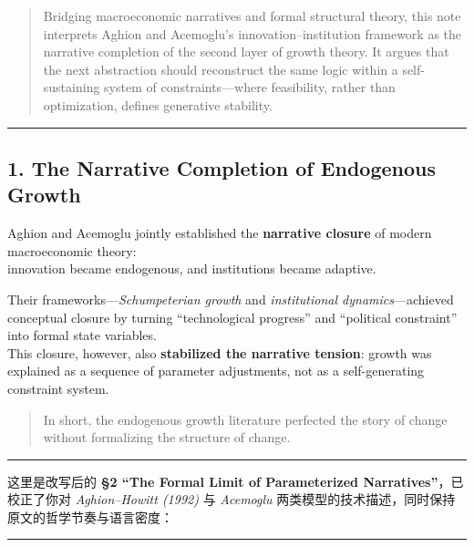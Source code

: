 \documentclass[11pt]{article}
\begin{document}
\begin{quote}
Bridging macroeconomic narratives and formal structural theory, this
note interprets Aghion and Acemoglu's innovation--institution framework
as the narrative completion of the second layer of growth theory. It
argues that the next abstraction should reconstruct the same logic
within a self-sustaining system of constraints---where feasibility,
rather than optimization, defines generative stability.
\end{quote}

\begin{center}\rule{0.5\linewidth}{0.5pt}\end{center}

\subsection{1. The Narrative Completion of Endogenous
Growth}\label{the-narrative-completion-of-endogenous-growth}

Aghion and Acemoglu jointly established the \textbf{narrative closure}
of modern macroeconomic theory:\\
innovation became endogenous, and institutions became adaptive.

Their frameworks---\emph{Schumpeterian growth} and \emph{institutional
dynamics}---achieved conceptual closure by turning ``technological
progress'' and ``political constraint'' into formal state variables.\\
This closure, however, also \textbf{stabilized the narrative tension}:
growth was explained as a sequence of parameter adjustments, not as a
self-generating constraint system.

\begin{quote}
In short, the endogenous growth literature perfected the story of change
without formalizing the structure of change.
\end{quote}

\begin{center}\rule{0.5\linewidth}{0.5pt}\end{center}

这里是改写后的 \textbf{§2 ``The Formal Limit of Parameterized
Narratives''}，已校正了你对 \emph{Aghion--Howitt (1992)} 与
\emph{Acemoglu} 两类模型的技术描述，同时保持原文的哲学节奏与语言密度：

\begin{center}\rule{0.5\linewidth}{0.5pt}\end{center}
\end{document}
